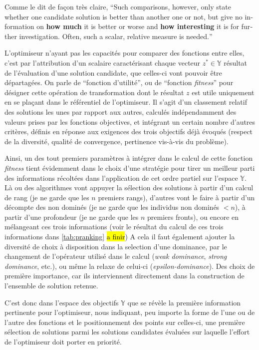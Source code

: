 Comme le dit de façon très claire,\textcite[94]{Weise2011} \foreignquote{english}{Such comparisons, however, only state whether one candidate solution is better than another one or not, but give no information on \textbf{how much} it is better or worse and \textbf{how interesting} it is for further investigation. Often, such a scalar, relative measure is needed.}

L'optimiseur n'ayant pas les capacités pour comparer des fonctions entre elles, c'est par l'attribution d'un scalaire caractérisant chaque vecteur $z^* \in \mathbb{Y}$ résultat de l'évaluation d'une solution candidate, que celles-ci vont pouvoir être départagées. On parle de \enquote{fonction d'utilité}, ou de \enquote{fonction \textit{fitness}} pour désigner cette opération de transformation dont le résultat $z$ est utile uniquement en se plaçant dans le référentiel de l'optimiseur. Il s'agit d'un classement relatif des solutions les unes par rapport aux autres, calculés indépendamment des valeurs prises par les fonctions objectives, et intégrant un certain nombre d'autres critères, définis en réponse aux exigences des trois objectifs déjà évoqués (respect de la diversité, qualité de convergence, pertinence vis-à-vis du problème).

Ainsi, un des tout premiers paramètres à intégrer dans le calcul de cette fonction \textit{fitness} tient évidemment dans le choix d'une stratégie pour tirer un meilleur parti des informations récoltées dans l'application de cet ordre partiel sur l'espace $\mathbb{Y}$. Là ou des algorithmes vont appuyer la sélection des solutions à partir d'un calcul de rang (je ne garde que les $n$ premiers rangs), d'autres vont le faire à partir d'un décompte des non dominés (je ne garde que les individus non dominés $< n$), à partir d'une profondeur (je ne garde que les $n$ premiers fronts), ou encore en mélangeant ces trois informations (voir le résultat du calcul de ces trois informations dans \ref{tab:pranking} \hl{a finir}) A cela il faut également ajouter la diversité de choix à disposition dans la selection d'une dominance, par le changement de l'opérateur utilisé dans le calcul (\textit{weak dominance}, \textit{strong dominance}, etc.), ou même la relaxe de celui-ci (\textit{epsilon-dominance}). Des choix de première importance, car ils interviennent directement dans la construction de l'ensemble de solution retenue.

C'est donc dans l'espace des objectifs $\mathbb{Y}$ que se révèle la première information pertinente pour l'optimiseur, nous indiquant, peu importe la forme de l'une ou de l'autre des fonctions et le positionnement des points sur celles-ci, une première sélection de solutions parmi les solutions candidates évaluées sur laquelle l'effort de l'optimiseur doit porter en priorité.

